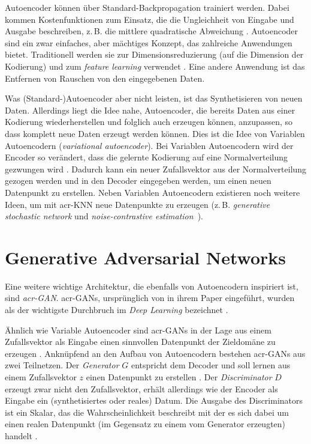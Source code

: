 Autoencoder können über Standard-Backpropagation trainiert werden. Dabei kommen
Kostenfunktionen zum Einsatz, die die Ungleichheit von Eingabe und Ausgabe
beschreiben, z.\,B. die mittlere quadratische Abweichung \cite{goodfellow2016deep}. Autoencoder sind ein zwar einfaches, aber mächtiges
Konzept, das zahlreiche Anwendungen bietet. Traditionell werden sie zur
Dimensionsreduzierung (auf die Dimension der Kodierung) und zum \emph{feature
learning} verwendet \cite{goodfellow2016deep}. Eine andere Anwendung ist
das Entfernen von Rauschen von den eingegebenen Daten.

Was (Standard-)Autoencoder aber nicht leisten, ist das Synthetisieren von neuen
Daten. Allerdings liegt die Idee nahe, Autoencoder, die bereits Daten aus einer
Kodierung wiederherstellen und folglich auch erzeugen können, anzupassen, so dass
komplett neue Daten erzeugt werden können. Dies ist die Idee von Variablen Autoencodern
(\emph{variational autoencoder}). Bei Variablen Autoencodern wird der Encoder
so verändert, dass die gelernte Kodierung auf eine Normalverteilung gezwungen
wird \cite{raschka2019}. Dadurch kann ein neuer Zufallsvektor aus der
Normalverteilung gezogen werden und in den Decoder eingegeben werden, um einen
neuen Datenpunkt zu erstellen.
Neben Variablen Autoencodern existieren noch weitere Ideen, um mit
\gls{acr-KNN} neue Datenpunkte zu erzeugen (z.\,B. \emph{generative
stochastic network} und
\emph{noise-contrastive estimation}~\cite{goodfellow2014generative}).

\section{Generative Adversarial Networks}\label{GANs}

Eine weitere wichtige Architektur, die ebenfalls von Autoencodern inspiriert ist,
sind \emph{\gls{acr-GAN}}. \gls{acr-GAN}s, ursprünglich \citeyear{goodfellow2014generative} von
\citeauthor{goodfellow2014generative} in ihrem Paper
 eingeführt, wurden als der wichtigste Durchbruch im
\emph{Deep Learning} bezeichnet \cite{raschka2019}.

Ähnlich wie Variable Autoencoder sind \gls{acr-GAN}s in der Lage aus einem Zufallsvektor
als Eingabe einen sinnvollen Datenpunkt der Zieldomäne zu erzeugen \cite{goodfellow2014generative}. Anknüpfend an den Aufbau von Autoencodern bestehen
\gls{acr-GAN}s aus zwei Teilnetzen. Der \emph{Generator} $G$ entspricht dem
Decoder und soll lernen aus einem Zufallsvektor $z$ einen Datenpunkt zu
erstellen \cites{goodfellow2014generative}{raschka2019}. Der
\emph{Discriminator} $D$ erzeugt zwar nicht den Zufallsvektor,
erhält allerdings wie der Encoder als Eingabe ein (synthetisiertes oder reales)
Datum. Die Ausgabe des Discriminators ist ein Skalar, das die
Wahrscheinlichkeit beschreibt 
mit der es sich dabei um einen realen Datenpunkt (im Gegensatz zu einem vom
Generator erzeugten) handelt \cite{goodfellow2014generative}.

